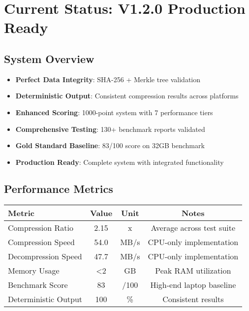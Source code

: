 \documentclass[12pt,a4paper]{article}
\begin{document}
\section{Current Status: V1.2.0 Production Ready}

\subsection{System Overview}
\begin{itemize}
    \item \textbf{Perfect Data Integrity}: SHA-256 + Merkle tree validation
    \item \textbf{Deterministic Output}: Consistent compression results across platforms
    \item \textbf{Enhanced Scoring}: 1000-point system with 7 performance tiers
    \item \textbf{Comprehensive Testing}: 130+ benchmark reports validated
    \item \textbf{Gold Standard Baseline}: 83/100 score on 32GB benchmark
    \item \textbf{Production Ready}: Complete system with integrated functionality
\end{itemize}

\subsection{Performance Metrics}
\begin{center}
\begin{tabular}{|l|c|c|c|}
\hline
\textbf{Metric} & \textbf{Value} & \textbf{Unit} & \textbf{Notes} \\
\hline
Compression Ratio & 2.15 & x & Average across test suite \\
Compression Speed & 54.0 & MB/s & CPU-only implementation \\
Decompression Speed & 47.7 & MB/s & CPU-only implementation \\
Memory Usage & <2 & GB & Peak RAM utilization \\
Benchmark Score & 83 & /100 & High-end laptop baseline \\
Deterministic Output & 100 & \% & Consistent results \\
\hline
\end{tabular}
\end{center}
\end{document}
